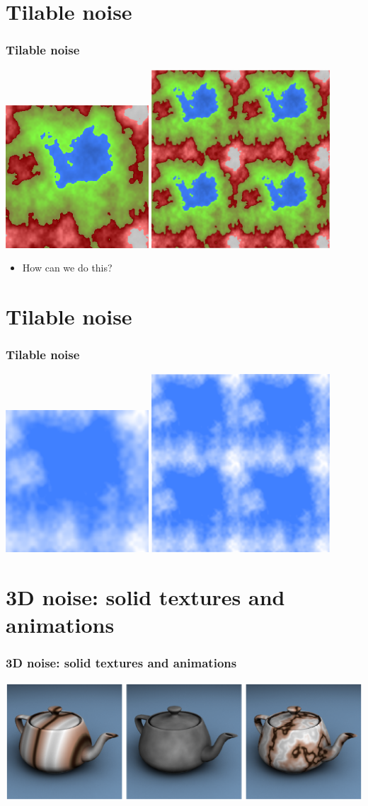 \documentclass[slidestop,xcolor=pst]{beamer}
\newcommand{\sect}[1]{
\section{#1}
\begin{frame}[fragile]\frametitle{#1}
}
\begin{document}
\sect{Tilable noise}
\includegraphics[width=0.4\textwidth]{terrain.eps}
\hfill
\includegraphics[width=0.5\textwidth]{tiledterrain.eps}
\begin{itemize}
\item How can we do this?
\end{itemize}
\end{frame}

\sect{Tilable noise}
\includegraphics[width=0.4\textwidth]{sky.eps}
\hfill
\includegraphics[width=0.5\textwidth]{tiledsky.eps}
\end{frame}

\sect{3D noise: solid textures and animations }
\includegraphics[width=\textwidth]{noise3d.eps}

\end{frame}
\end{document}
